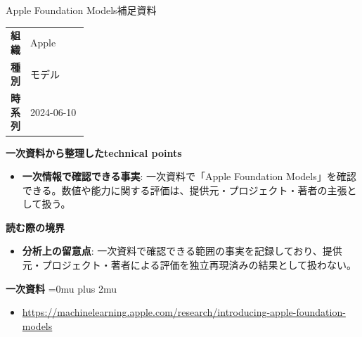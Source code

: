 \begin{technicalnote}{Apple Foundation Models}{補足資料}
\begingroup
\begin{tabularx}{\linewidth}{@{}>{\bfseries}p{0.22\linewidth}X@{}}
組織 & Apple \\
種別 & モデル \\
時系列 & 2024-06-10 \\
\end{tabularx}
\smallskip
{\bfseries 一次資料から整理したtechnical points}
\begin{itemize}[leftmargin=1.5em,itemsep=0.35em]
\item \textbf{一次情報で確認できる事実}: 一次資料で「Apple Foundation Models」を確認できる。数値や能力に関する評価は、提供元・プロジェクト・著者の主張として扱う。
\end{itemize}
\begin{minipage}{\linewidth}
{\bfseries 読む際の境界}
\begin{itemize}[leftmargin=1.5em,itemsep=0.35em]
\item \textbf{分析上の留意点}: 一次資料で確認できる範囲の事実を記録しており、提供元・プロジェクト・著者による評価を独立再現済みの結果として扱わない。
\end{itemize}
\begin{samepage}
{\bfseries 一次資料}
\begingroup\sloppy
\Urlmuskip=0mu plus 2mu\relax
\begin{itemize}[leftmargin=1.5em,itemsep=0.25em]
\item {\scriptsize\url{https://machinelearning.apple.com/research/introducing-apple-foundation-models}}
\end{itemize}
\endgroup
\end{samepage}
\end{minipage}
\endgroup
\end{technicalnote}
\medskip

